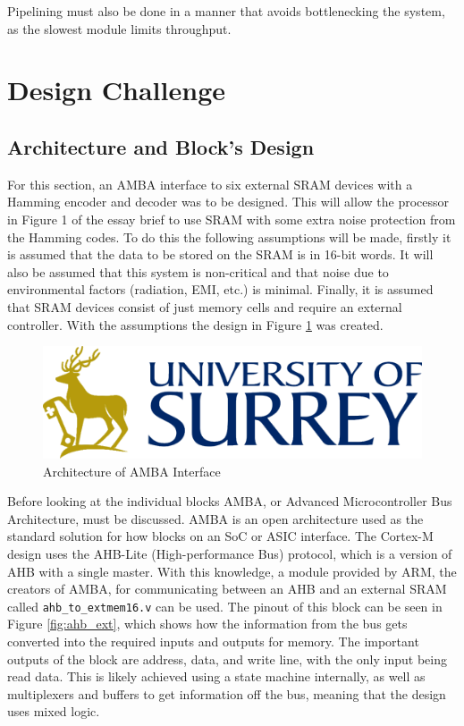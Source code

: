 \documentclass[11pt]{article}
\begin{document}
Pipelining must also be done in a manner that avoids bottlenecking the system, as the slowest module limits throughput.


\section{Design Challenge}
\subsection{Architecture and Block's Design} \label{sec:block}
For this section, an AMBA interface to six external SRAM devices with a Hamming encoder and decoder was to be designed.
This will allow the processor in Figure 1 of the essay brief to use SRAM with some extra noise protection from the Hamming codes.
To do this the following assumptions will be made, firstly it is assumed that the data to be stored on the SRAM is in 16-bit words.
It will also be assumed that this system is non-critical and that noise due to environmental factors (radiation, EMI, etc.) is minimal. 
Finally, it is assumed that SRAM devices consist of just memory cells and require an external controller.
With the assumptions the design in Figure \ref{fig:amba} was created.

\begin{figure}[H]        
    \centering
    \includegraphics[width=\textwidth]{logo.png}
    \caption{Architecture of AMBA Interface}
    \label{fig:amba}
\end{figure} 

Before looking at the individual blocks AMBA, or Advanced Microcontroller Bus Architecture, must be discussed.
AMBA is an open architecture used as the standard solution for how blocks on an SoC or ASIC interface\cite{amba}.
The Cortex-M design uses the AHB-Lite (High-performance Bus) protocol, which is a version of AHB with a single master.
With this knowledge, a module provided by ARM, the creators of AMBA,
for communicating between an AHB and an external SRAM called \texttt{ahb\_to\_extmem16.v} can be used\cite{sram_arm}.
The pinout of this block can be seen in Figure \ref{fig:ahb_ext}, which shows how the information from the bus gets converted into the required inputs and outputs for memory.
The important outputs of the block are address, data, and write line, with the only input being read data.
This is likely achieved using a state machine internally, as well as multiplexers and buffers to get information off the bus, meaning that the design uses mixed logic.
\end{document}
